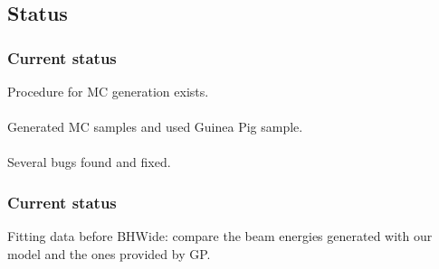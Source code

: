 \documentclass[handout]{beamer}
\begin{document}
\subsection{Status}
\begin{frame}
\frametitle{Current status}
Procedure for MC generation exists.\\
~\\
Generated MC samples and used Guinea Pig sample.\\
~\\
Several bugs found and fixed.
\end{frame}

\begin{frame}
\frametitle{Current status}
Fitting data before BHWide: compare the beam energies generated with our model
and the ones provided by GP.

\end{frame}
\end{document}

